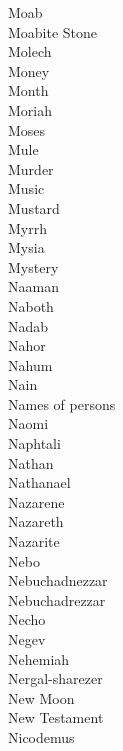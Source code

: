Moab  \\
Moabite Stone  \\
Molech  \\
Money  \\
Month  \\
Moriah  \\
Moses  \\
Mule  \\
Murder  \\
Music  \\
Mustard  \\
Myrrh  \\
Mysia  \\
Mystery  \\
Naaman  \\
Naboth  \\
Nadab  \\
Nahor  \\
Nahum  \\
Nain  \\
Names of persons  \\
Naomi  \\
Naphtali  \\
Nathan  \\
Nathanael  \\
Nazarene  \\
Nazareth  \\
Nazarite  \\
Nebo  \\
Nebuchadnezzar  \\
Nebuchadrezzar  \\
Necho  \\
Negev  \\
Nehemiah  \\
Nergal-sharezer  \\
New Moon  \\
New Testament  \\
Nicodemus  \\

